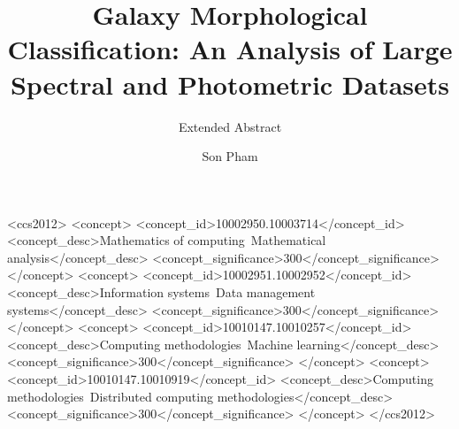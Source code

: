 \documentclass[11pt,sigconf]{acmart}
\begin{document}
\title{Galaxy Morphological Classification: An Analysis of Large Spectral and Photometric Datasets}
\subtitle{Extended Abstract}

\author{Son Pham}


\renewcommand{\shortauthors}{S. Pham}


\begin{abstract}

\end{abstract}

%
%
\begin{CCSXML}
  <ccs2012>
  <concept>
  <concept_id>10002950.10003714</concept_id>
  <concept_desc>Mathematics of computing~Mathematical analysis</concept_desc>
  <concept_significance>300</concept_significance>
  </concept>
  <concept>
  <concept_id>10002951.10002952</concept_id>
  <concept_desc>Information systems~Data management systems</concept_desc>
  <concept_significance>300</concept_significance>
  </concept>
  <concept>
  <concept_id>10010147.10010257</concept_id>
  <concept_desc>Computing methodologies~Machine learning</concept_desc>
  <concept_significance>300</concept_significance>
  </concept>
  <concept>
  <concept_id>10010147.10010919</concept_id>
  <concept_desc>Computing methodologies~Distributed computing methodologies</concept_desc>
  <concept_significance>300</concept_significance>
  </concept>
  </ccs2012>
\end{CCSXML}





\maketitle
\end{document}
